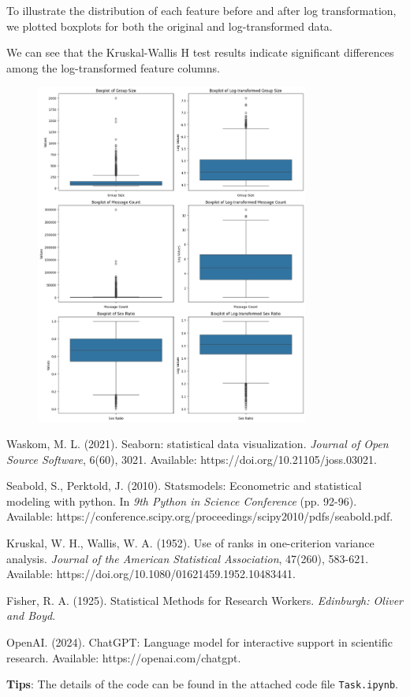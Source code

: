 \documentclass[12pt]{article}
\begin{document}
To illustrate the distribution of each feature before and after log transformation, we plotted boxplots for both the original and log-transformed data.

We can see that the Kruskal-Wallis H test results indicate significant differences among the log-transformed feature columns.
\newpage
\begin{figure}[h]
    \centering
    \includegraphics[width=0.8\textwidth]{image/output4.png}  
    \label{fig:Boxplot of Original and Log-transformed Data}
\end{figure}

\newpage
\begin{thebibliography}{99}

    Waskom, M. L. (2021). Seaborn: statistical data visualization. \emph{Journal of Open Source Software}, 6(60), 3021. Available: https://doi.org/10.21105/joss.03021.
    
    Seabold, S., Perktold, J. (2010). Statsmodels: Econometric and statistical modeling with python. In \emph{9th Python in Science Conference} (pp. 92-96). Available: https://conference.scipy.org/proceedings/scipy2010/pdfs/seabold.pdf.
    
    Kruskal, W. H., Wallis, W. A. (1952). Use of ranks in one-criterion variance analysis. \emph{Journal of the American Statistical Association}, 47(260), 583-621. Available: https://doi.org/10.1080/01621459.1952.10483441.
    
    Fisher, R. A. (1925). Statistical Methods for Research Workers. \emph{Edinburgh: Oliver and Boyd}.
    
    OpenAI. (2024). ChatGPT: Language model for interactive support in scientific research. Available: https://openai.com/chatgpt.
    
\end{thebibliography}
    
\textbf{Tips}: The details of the code can be found in the attached code file \texttt{Task.ipynb}.
    
\end{document}
